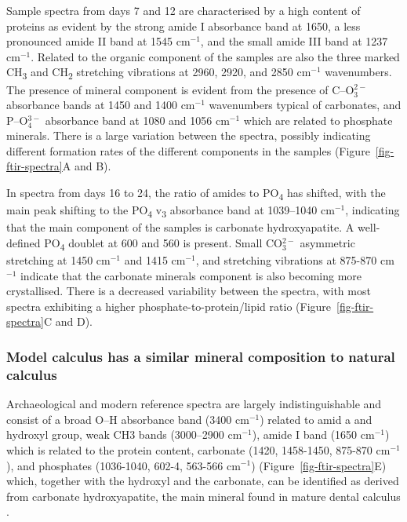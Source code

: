 \documentclass[10pt,a4paper]{article}
\begin{document}
Sample spectra from days 7 and 12 are characterised by a high content of
proteins as evident by the strong amide I absorbance band at 1650, a
less pronounced amide II band at 1545 cm\(^{-1}\), and the small amide
III band at 1237 cm\(^{-1}\). Related to the organic component of the
samples are also the three marked CH\textsubscript{3} and
CH\textsubscript{2} stretching vibrations at 2960, 2920, and 2850
cm\(^{-1}\) wavenumbers. The presence of mineral component is evident
from the presence of C--O\(^{2-}_3\) absorbance bands at 1450 and 1400
cm\(^{-1}\) wavenumbers typical of carbonates, and P--O\(^{3-}_4\)
absorbance band at 1080 and 1056 cm\(^{-1}\) which are related to
phosphate minerals. There is a large variation between the spectra,
possibly indicating different formation rates of the different
components in the samples (Figure~\ref{fig-ftir-spectra}A and B).

In spectra from days 16 to 24, the ratio of amides to
PO\textsubscript{4} has shifted, with the main peak shifting to the
PO\textsubscript{4} v\textsubscript{3} absorbance band at 1039--1040
cm\(^{-1}\), indicating that the main component of the samples is
carbonate hydroxyapatite. A well-defined PO\textsubscript{4} doublet at
600 and 560 is present. Small CO\(_3^{2-}\) asymmetric stretching at
1450 cm\(^{-1}\) and 1415 cm\(^{-1}\), and stretching vibrations at
875-870 cm\(^{-1}\) indicate that the carbonate minerals component is
also becoming more crystallised. There is a decreased variability
between the spectra, with most spectra exhibiting a higher
phosphate-to-protein/lipid ratio (Figure~\ref{fig-ftir-spectra}C and D).

\subsubsection*{Model calculus has a similar mineral composition to
natural
calculus}\label{model-calculus-has-a-similar-mineral-composition-to-natural-calculus}

Archaeological and modern reference spectra are largely
indistinguishable and consist of a broad O--H absorbance band (3400
cm\(^{-1}\)) related to amid a and hydroxyl group, weak CH3 bands
(3000--2900 cm\(^{-1}\)), amide I band (1650 cm\(^{-1}\)) which is
related to the protein content, carbonate (1420, 1458-1450, 875-870
cm\(^{-1}\)), and phosphates (1036-1040, 602-4, 563-566 cm\(^{-1}\))
(Figure~\ref{fig-ftir-spectra}E) which, together with the hydroxyl and
the carbonate, can be identified as derived from carbonate
hydroxyapatite, the main mineral found in mature dental calculus
\citep{hayashizakiSiteSpecific2008, jinSupragingivalCalculus2002}.
\end{document}
